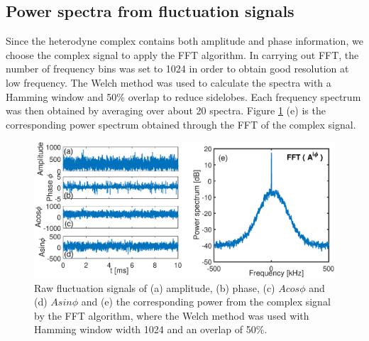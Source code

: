 \subsection{Power spectra from fluctuation signals}

Since the heterodyne complex contains both amplitude and phase information, we choose the complex signal to apply the FFT algorithm. In carrying out FFT, the number of frequency bins was set to 1024 in order to obtain good resolution at low frequency. The Welch method \cite{Welch_1967_IEEE} was used to calculate the spectra with a Hamming window and 50\% overlap to reduce sidelobes. Each frequency spectrum was then obtained by averaging over about 20 spectra. Figure \ref{fig:signal} (e) is the corresponding power spectrum obtained through the FFT of the complex signal.


\begin{figure}[h]
\begin{centering}
\includegraphics[scale=0.45]{signal.eps}
\par\end{centering}
\caption[Fluctuation signals]{Raw fluctuation signals of (a) amplitude, (b) phase, (c) $Acos\phi$ and (d) $Asin\phi$ and (e) the corresponding power from the complex signal by the FFT algorithm, where the Welch method was used with Hamming window width 1024 and an overlap of 50\%.}
\label{fig:signal}
\end{figure}


